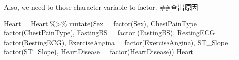 \documentclass[
]{article}
\newenvironment{Shaded}{\begin{snugshade}}{\end{snugshade}}
\newcommand{\AttributeTok}[1]{\textcolor[rgb]{0.77,0.63,0.00}{#1}}
\newcommand{\FunctionTok}[1]{\textcolor[rgb]{0.00,0.00,0.00}{#1}}
\newcommand{\NormalTok}[1]{#1}
\newcommand{\OtherTok}[1]{\textcolor[rgb]{0.56,0.35,0.01}{#1}}
\newcommand{\SpecialCharTok}[1]{\textcolor[rgb]{0.00,0.00,0.00}{#1}}
\begin{document}
Also, we need to those character variable to factor. \#\#查出原因

\begin{Shaded}
\begin{Highlighting}[]
\NormalTok{Heart }\OtherTok{=}\NormalTok{ Heart }\SpecialCharTok{\%\textgreater{}\%} 
  \FunctionTok{mutate}\NormalTok{(}\AttributeTok{Sex =} \FunctionTok{factor}\NormalTok{(Sex),}
         \AttributeTok{ChestPainType =} \FunctionTok{factor}\NormalTok{(ChestPainType),}
         \AttributeTok{FastingBS =} \FunctionTok{factor}\NormalTok{ (FastingBS),}
         \AttributeTok{RestingECG =} \FunctionTok{factor}\NormalTok{(RestingECG),}
         \AttributeTok{ExerciseAngina =} \FunctionTok{factor}\NormalTok{(ExerciseAngina),}
         \AttributeTok{ST\_Slope =} \FunctionTok{factor}\NormalTok{(ST\_Slope),}
         \AttributeTok{HeartDisease =} \FunctionTok{factor}\NormalTok{(HeartDisease))}
\NormalTok{Heart}
\end{Highlighting}
\end{Shaded}
\end{document}
